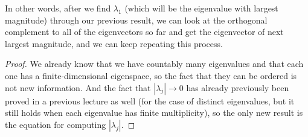 In other words, after we find $\lambda_1$ (which will be the eigenvalue with largest magnitude) through our previous result, we can look at the orthogonal complement to all of the eigenvectors so far and get the eigenvector of next largest magnitude, and we can keep repeating this process.

\begin{proof}
We already know that we have countably many eigenvalues and that each one has a finite-dimensional eigenspace, so the fact that they can be ordered is not new information. And the fact that $|\lambda_j| \to 0$ has already previously been proved in a previous lecture as well (for the case of distinct eigenvalues, but it still holds when each eigenvalue has finite multiplicity), so the only new result is the equation for computing $|\lambda_j|$. 


\end{proof}
